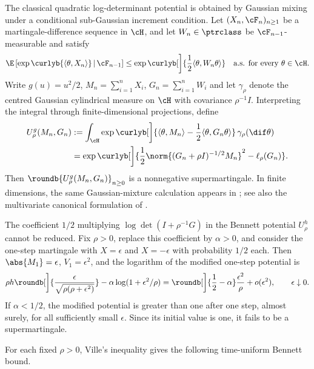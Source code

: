 \documentclass[11pt]{article}
\begin{document}
\begin{remark}
The classical quadratic log-determinant potential is obtained by Gaussian mixing under a conditional sub-Gaussian increment condition. Let $(X_n,\cF_n)_{n\ge1}$ be a martingale-difference sequence in $\cH$, and let $W_n\in\ptrclass$ be $\cF_{n-1}$-measurable and satisfy
\[
  \E\left[\exp\curlyb{\langle\theta,X_n\rangle}\,\middle|\,\cF_{n-1}\right]
  \le
  \exp\curlyb[\bigg]{\frac12\langle\theta,W_n\theta\rangle}
  \quad\text{a.s. for every $\theta\in\cH$.}
\]
Write $g(u) = u^2/2$, $M_n=\sum_{i=1}^nX_i$, $G_n=\sum_{i=1}^nW_i$ and let $\gamma_\rho$ denote the centred Gaussian cylindrical measure on $\cH$ with covariance $\rho^{-1}I$. Interpreting the integral through finite-dimensional projections, define
\begin{align*}
  U_\rho^g(M_n,G_n)
  &:=
  \int_{\cH}\exp\curlyb[\bigg]{\langle\theta,M_n\rangle-\frac12\langle\theta,G_n\theta\rangle}\,\gamma_\rho(\dif\theta) \\
  &=
  \exp\curlyb[\bigg]{\frac12\norm{(G_n+\rho I)^{-1/2}M_n}^{2}-\ell_\rho(G_n)}.
\end{align*}
Then $\roundb{U_\rho^g(M_n,G_n)}_{n\ge0}$ is a nonnegative supermartingale. In finite dimensions, the same Gaussian-mixture calculation appears in \citet[Eqns.~4.18--4.20]{delapena2004selfnormalized}; see also the multivariate canonical formulation of \citet[Thm.~14.7]{delapena2009selfnormalized}.
\end{remark}


\begin{remark}\label{rem:scalar-calibration}
The coefficient $1/2$ multiplying $\log\det(I+\rho^{-1}G)$ in the Bennett potential $U_\rho^h$ cannot be reduced. Fix $\rho>0$, replace this coefficient by $\alpha>0$, and consider the one-step martingale with $X=\epsilon$ and $X=-\epsilon$ with probability $1/2$ each. Then $\abs{M_1}=\epsilon$, $V_1=\epsilon^2$, and the logarithm of the modified one-step potential is
\[
  \rho h\roundb[\bigg]{\frac{\epsilon}{\sqrt{\rho(\rho+\epsilon^2)}}}
  -\alpha\log(1+\epsilon^2/\rho)
  =
  \roundb[\bigg]{\frac12-\alpha}\frac{\epsilon^2}{\rho}
  +o(\epsilon^2),
  \qquad \epsilon\downarrow0.
\]
If $\alpha<1/2$, the modified potential is greater than one after one step, almost surely, for all sufficiently small $\epsilon$. Since its initial value is one, it fails to be a supermartingale.
\end{remark}

For each fixed $\rho>0$, Ville's inequality gives the following time-uniform Bennett bound.
\end{document}
